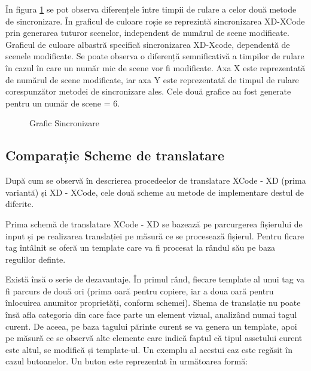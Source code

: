 În figura \ref{fig:GraficSinc2} se pot observa diferențele între timpii de rulare a celor două metode de sincronizare. În graficul de culoare roșie se reprezintă sincronizarea XD-XCode prin generarea tuturor scenelor, independent de numărul de scene modificate. Graficul de culoare albastră specifică sincronizarea XD-Xcode, dependentă de scenele modificate. Se poate observa o diferență semnificativă a timpilor de rulare în cazul în care un număr mic de scene vor fi modificate. Axa X este reprezentată de numărul de scene modificate, iar axa Y este reprezentată de timpul de rulare corespunzător metodei de sincronizare ales. Cele două grafice au fost generate pentru un număr de scene = 6.

\begin{figure}[!htbp]
\centering
{}
\caption{Grafic Sincronizare} \label{fig:GraficSinc2}
\end{figure}

\subsection{Comparație Scheme de translatare}

După cum se observă în descrierea procedeelor de translatare XCode - XD  (prima variantă) și XD - XCode, cele două scheme au metode de implementare destul de diferite. 

Prima schemă de translatare XCode - XD se bazează pe parcurgerea fișierului de input și pe realizarea translației pe măsură ce se procesează fișierul. Pentru ficare tag întâlnit se oferă un template care va fi procesat la rândul său pe baza regulilor definte. 

Există însă o serie de dezavantaje. În primul rând, fiecare template al unui tag va fi parcurs de două ori (prima oară pentru copiere, iar a doua oară pentru înlocuirea anumitor proprietăți, conform schemei). 
Shema de translație nu poate însă afla categoria din care face parte un element vizual, analizând numai tagul curent. De aceea, pe baza tagului părinte curent se va genera un template, apoi pe măsură ce se observă alte elemente care indică faptul că tipul assetului curent este altul, se modifică și template-ul. Un exemplu al acestui caz este regăsit în cazul butoanelor. Un buton este reprezentat în următoarea formă:

